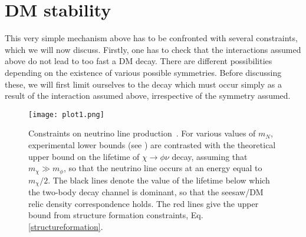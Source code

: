 \documentclass[prd,a4paper,twocolumn,preprintnumbers,nofootinbib,superscriptaddress]{revtex4}
\begin{document}
	
\section{DM stability}
This very simple mechanism above has to be confronted with several constraints, which we will now discuss. 
Firstly, one has to check that the interactions assumed above 
do not lead to too fast a DM decay. There are different possibilities depending on the existence of various possible symmetries. Before discussing these, we will first limit ourselves to the decay which must occur simply as a result of the interaction assumed above, irrespective of the symmetry assumed.
	
\begin{figure}[t]
	\centering
	\texttt{[image: plot1.png]}
	\vspace{-0.3cm}
	\caption{Constraints on neutrino line production~\cite{Collaboration:2011jza,Zhang:2013tua,Malek:2002ns,Bellini:2010gn,FrankiewiczonbehalfoftheSuper-KamiokandeCollaboration:2016pkv}. For various values of $m_N$, experimental lower bounds (see \cite{Garcia-Cely:2017oco,Coy:2020wxp}) are contrasted with the theoretical upper bound on the lifetime of $\chi\rightarrow \phi \nu$ decay, assuming that $m_\chi \gg m_\phi$, so that the neutrino line occurs at an energy equal to $m_\chi/2$. 
	The black lines denote the value of the lifetime below which the two-body decay channel is dominant, so that the seesaw/DM relic density correspondence holds. The red lines give the upper bound from structure formation constraints, Eq. \eqref{structureformation}.}
		\label{plot1}
\end{figure}
	
\end{document}
